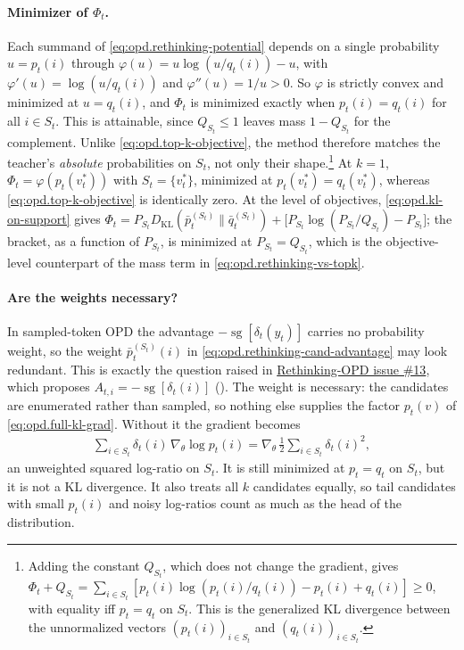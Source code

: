 \paragraph{Minimizer of $\Phi_t$.}
Each summand of \eqref{eq:opd.rethinking-potential} depends on a single probability
$u=p_t(i)$ through $\varphi(u)=u\log(u/q_t(i))-u$, with $\varphi'(u)=\log(u/q_t(i))$ and
$\varphi''(u)=1/u>0$. So $\varphi$ is strictly convex and minimized at $u=q_t(i)$, and
$\Phi_t$ is minimized exactly when $p_t(i)=q_t(i)$ for all $i\in S_t$. This is
attainable, since $Q_{S_t}\le 1$ leaves mass $1-Q_{S_t}$ for the complement. Unlike
\eqref{eq:opd.top-k-objective}, the method therefore matches the teacher's
\emph{absolute} probabilities on $S_t$, not only their shape.\footnote{Adding the
constant $Q_{S_t}$, which does not change the gradient, gives
$\Phi_t+Q_{S_t}=\sum_{i\in S_t}[p_t(i)\log(p_t(i)/q_t(i))-p_t(i)+q_t(i)]\ge 0$, with
equality iff $p_t=q_t$ on $S_t$. This is the generalized KL divergence between the
unnormalized vectors $(p_t(i))_{i\in S_t}$ and $(q_t(i))_{i\in S_t}$.}
At $k=1$, $\Phi_t=\varphi(p_t(v_t^*))$ with $S_t=\{v_t^*\}$, minimized at
$p_t(v_t^*)=q_t(v_t^*)$, whereas \eqref{eq:opd.top-k-objective} is identically zero. At the
level of objectives, \eqref{eq:opd.kl-on-support} gives
$\Phi_t=P_{S_t}D_{\mathrm{KL}}(\bar p_t^{(S_t)}\|\bar q_t^{(S_t)})+\big[P_{S_t}\log(P_{S_t}/Q_{S_t})-P_{S_t}\big]$;
the bracket, as a function of $P_{S_t}$, is minimized at $P_{S_t}=Q_{S_t}$, which is the
objective-level counterpart of the mass term in \eqref{eq:opd.rethinking-vs-topk}.

\paragraph{Are the weights necessary?}
In sampled-token OPD the advantage $-\operatorname{sg}[\delta_t(y_t)]$ carries no probability
weight, so the weight $\bar p_t^{(S_t)}(i)$ in \eqref{eq:opd.rethinking-cand-advantage} may look
redundant. This is exactly the question raised in
\href{https://github.com/Thinking-Space/Rethinking-OPD/issues/13}{Rethinking-OPD issue \#13},
which proposes $A_{t,i}=-\operatorname{sg}[\delta_t(i)]$ (). The
weight is necessary: the candidates are enumerated rather than sampled, so nothing else
supplies the factor $p_t(v)$ of \eqref{eq:opd.full-kl-grad}. Without it the gradient becomes
\begin{align}
    \sum_{i\in S_t}\delta_t(i)\,\nabla_\theta\log p_t(i)
    =
    \nabla_\theta\,
    \frac{1}{2}\sum_{i\in S_t}\delta_t(i)^2,
\end{align}
an unweighted squared log-ratio on $S_t$. It is still minimized at $p_t=q_t$ on
$S_t$, but it is not a KL divergence. It also treats all $k$ candidates equally, so
tail candidates with small $p_t(i)$ and noisy log-ratios count as much as the head of
the distribution.


